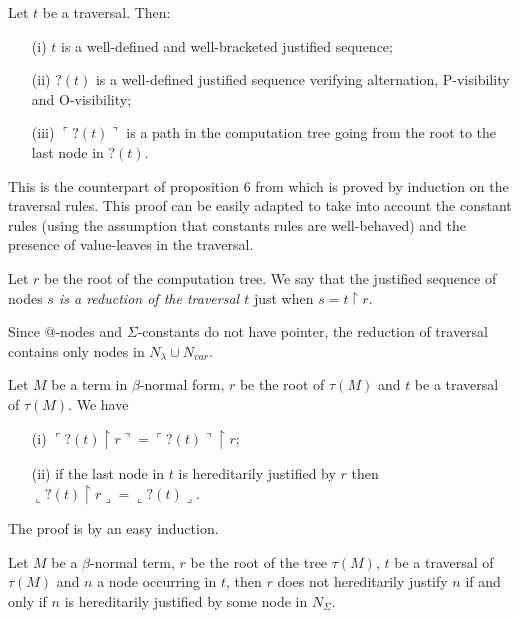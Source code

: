 \documentclass{llncs}
\newcommand\union{\cup}
\newcommand{\oview}[1]{\llcorner #1 \lrcorner}
\newcommand{\pview}[1]{\ulcorner #1 \urcorner}
\begin{document}
\begin{proposition}
\label{prop:pviewtrav_is_path}
Let $t$ be a traversal. Then:
\begin{itemize}
\item[(i)] $t$ is a well-defined and well-bracketed justified sequence;
\item[(ii)] $?(t)$ is a well-defined justified sequence verifying alternation, P-visibility and O-visibility;
\item[(iii)] $\pview{?(t)}$ is a path in the computation tree going from the root to the last node in $?(t)$.
\end{itemize}
\end{proposition}
This is the counterpart of proposition 6 from
\cite{OngHoMchecking2006} which is proved by induction on the
traversal rules. This proof can be easily adapted to take into
account the constant rules (using the assumption that constants
rules are well-behaved) and the presence of value-leaves in the
traversal.



\begin{definition}
Let $r$ be the root of the computation tree. We say that the
justified sequence of nodes \emph{$s$ is a reduction of the
traversal $t$} just when $s = t \upharpoonright r$.
\end{definition}

Since @-nodes and $\Sigma$-constants do not have pointer, the
reduction of traversal contains only nodes in $N_\lambda \union
N_{var}$.


\begin{lemma}
\label{lem:redtrav_trav} Let $M$ be a term in $\beta$-normal form,
$r$ be the root of $\tau(M)$ and $t$ be a traversal of $\tau(M)$. We
have
\begin{itemize}
\item[(i)] $ \pview{?(t) \upharpoonright  r } = \pview{?(t)} \upharpoonright r$;
\item[(ii)] if the last node in $t$ is hereditarily justified by $r$ then $ \oview{?(t) \upharpoonright r } = \oview{?(t)}$.
\end{itemize}
\end{lemma}
The proof is by an easy induction.

\begin{lemma}
\label{lem:betaeta_trav}
Let $M$ be a $\beta$-normal term, $r$ be the root of the tree $\tau(M)$,
$t$ be a traversal of $\tau(M)$ and $n$ a node occurring in $t$, then
$r$ does not hereditarily justify $n$ if and only if $n$ is
hereditarily justified by some node in $N_\Sigma$.
\end{lemma}
\end{document}
